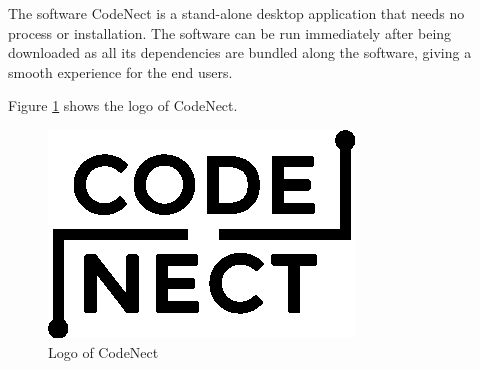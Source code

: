 
The software CodeNect is a stand-alone desktop application that needs no process
or installation. The software can be run immediately after being downloaded as
all its dependencies are bundled along the software, giving a smooth experience
for the end users.

\parx
Figure \ref{fig:cn_logo} shows the logo of CodeNect.

\begin{figure}[H]
	\centering
	\captionsetup{justification=centering}
	\captionsetup[figure]{list=yes}
	\includegraphics[width=\linewidth]{media/cn_logo.png}
	\caption[CodeNect Logo]{Logo of CodeNect}
	\label{fig:cn_logo}
\end{figure}
